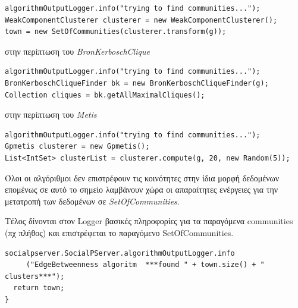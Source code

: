 \begin{description}
\begin{description}
\begin{lstlisting}[frame=single]
algorithmOutputLogger.info("trying to find communities...");        
WeakComponentClusterer clusterer = new WeakComponentClusterer();        
town = new SetOfCommunities(clusterer.transform(g));
\end{lstlisting} 
  \item στην περίπτωση του \emph{BronKerboschClique}
\begin{lstlisting}[frame=single]
algorithmOutputLogger.info("trying to find communities...");                        
BronKerboschCliqueFinder bk = new BronKerboschCliqueFinder(g);
Collection cliques = bk.getAllMaximalCliques();
\end{lstlisting} 
  \item στην περίπτωση του \emph{Metis}
\begin{lstlisting}[frame=single]
algorithmOutputLogger.info("trying to find communities...");                
Gpmetis clusterer = new Gpmetis();            
List<IntSet> clusterList = clusterer.compute(g, 20, new Random(5));
\end{lstlisting} 
  \end{description}  
  Όλοι οι αλγόριθμοι δεν επιστρέφουν τις κοινότητες στην ίδια μορφή δεδομένων επομένως σε αυτό το σημείο λαμβάνουν χώρα 
  οι απαραίτητες ενέργειες για την μετατροπή των δεδομένων σε \emph{SetOfCommunities}. 
  
  
  Τέλος δίνονται στον Logger βασικές πληροφορίες για τα παραγόμενα communities (πχ πλήθος) και επιστρέφεται το παραγόμενο SetOfCommunities.
\begin{lstlisting}[frame=single]           
  socialpserver.SocialPServer.algorithmOutputLogger.info
	 ("EdgeBetweenness algoritm  ***found " + town.size() + " clusters***");                
  return town;
}   
\end{lstlisting}   


\end{description}
